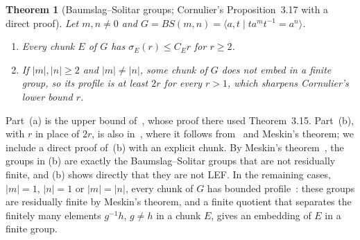 \documentclass[11pt,a4paper]{article}
\theoremstyle{plain}
\newtheorem{theorem}{Theorem}[section]
\theoremstyle{definition}
\theoremstyle{remark}
\begin{document}
\begin{theorem}[Baumslag--Solitar groups; Cornulier's Proposition~3.17 with a direct proof]\label{thm:bs}
Let $m,n\ne0$ and $G=BS(m,n)=\langle a,t\mid ta^mt^{-1}=a^n\rangle$.
\begin{enumerate}[label=(\alph*),itemsep=0pt]
\item Every chunk $E$ of $G$ has $\sigma_E(r)\le C_Er$ for $r\ge2$.
\item If $|m|,|n|\ge2$ and $|m|\ne|n|$, some chunk of $G$ does not embed in a finite group, so its profile is at least $2r$ for every $r>1$,
which sharpens Cornulier's lower bound $r$.
\end{enumerate}
\end{theorem}

Part~(a) is the upper bound of~\cite[Proposition~3.17]{Cornulier2013}, whose proof there used Theorem~3.15. Part~(b), with $r$ in place
of $2r$, is also in~\cite[Proposition~3.17]{Cornulier2013}, where it follows from~\cite[Fact~3.8]{Cornulier2013} and Meskin's theorem; we
include a direct proof of~(b) with an explicit chunk. By Meskin's theorem~\cite{Meskin1972}, the groups in (b) are exactly the
Baumslag--Solitar groups that are not residually finite, and (b) shows directly that they are not LEF. In the remaining cases, $|m|=1$,
$|n|=1$ or $|m|=|n|$, every chunk of $G$ has bounded profile~\cite[Proposition~3.17]{Cornulier2013}: these groups are residually finite by
Meskin's theorem, and a finite quotient that separates the finitely many elements $g^{-1}h$, $g\ne h$ in a chunk $E$, gives an embedding
of $E$ in a finite group.
\end{document}
